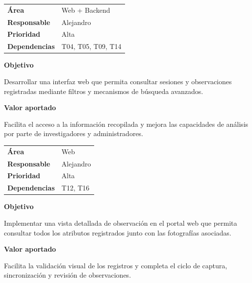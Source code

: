 \begin{tcolorbox}[title=T16 -- Listado de sesiones y observaciones con filtros,colback=gray!5,colframe=black!70,fonttitle=\bfseries]

\begin{tabularx}{\textwidth}{lX}
\textbf{Área} & Web + Backend \\
\textbf{Responsable} & Alejandro \\
\textbf{Prioridad} & Alta \\
\textbf{Dependencias} & T04, T05, T09, T14 \\
\end{tabularx}

\vspace{0.2cm}

\textbf{Objetivo}

Desarrollar una interfaz web que permita consultar sesiones y observaciones
registradas mediante filtros y mecanismos de búsqueda avanzados.

\vspace{0.15cm}

\textbf{Valor aportado}

Facilita el acceso a la información recopilada y mejora las capacidades de
análisis por parte de investigadores y administradores.

\end{tcolorbox}

\begin{tcolorbox}[title=T17 -- Ficha de observación con fotografías,colback=gray!5,colframe=black!70,fonttitle=\bfseries]

\begin{tabularx}{\textwidth}{lX}
\textbf{Área} & Web \\
\textbf{Responsable} & Alejandro \\
\textbf{Prioridad} & Alta \\
\textbf{Dependencias} & T12, T16 \\
\end{tabularx}

\vspace{0.2cm}

\textbf{Objetivo}

Implementar una vista detallada de observación en el portal web que permita
consultar todos los atributos registrados junto con las fotografías asociadas.

\vspace{0.15cm}

\textbf{Valor aportado}

Facilita la validación visual de los registros y completa el ciclo de captura,
sincronización y revisión de observaciones.

\end{tcolorbox}
